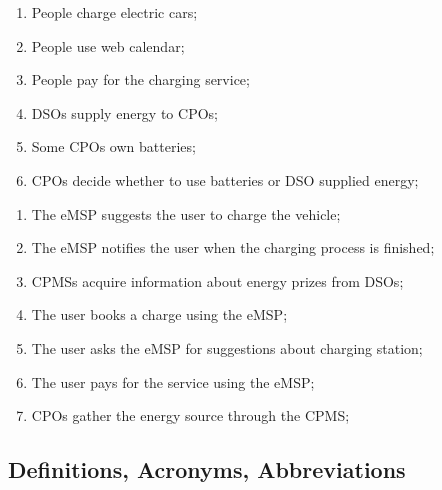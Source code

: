 \begin{enumerate}[label=W\arabic*]
    \item People charge electric cars; \label{world:people-charge-cars}
    \item People use web calendar; \label{world:people-use-calendars}
    \item People pay for the charging service; \label{world:people-pay-service}
    \item \acp{DSO} supply energy to \acp{CPO}; \label{world:DSO-supply-energy}
    \item Some \acp{CPO} own batteries; \label{world:CPO-own-batteries}
    \item \acp{CPO} decide whether to use batteries or \ac{DSO} supplied energy; \label{world:CPO-decide-energy}
\end{enumerate}
\begin{enumerate}[label=S\arabic*]
    \item The \ac{eMSP} suggests the user to charge the vehicle; \label{shared:eMSP-suggests-charge}
    \item The \ac{eMSP} notifies the user when the charging process is finished; \label{shared:eMSP-notifies-charging-finished}
    \item \acp{CPMS} acquire information about energy prizes from \acp{DSO}; \label{shared:CPMS-info-from-DSO}
    \item The user books a charge using the \ac{eMSP}; \label{shared:user-books-charge}
    \item The user asks the \ac{eMSP} for suggestions about charging station; \label{shared:user-asks-suggestions}
    \item The user pays for the service using the \ac{eMSP}; \label{shared:user-pays-service}
    \item \acp{CPO} gather the energy source through the \ac{CPMS}; \label{shared:CPO-energy-through-CPMS}
\end{enumerate}

\subsection{Definitions, Acronyms, Abbreviations}
\begin{multicols}{2}[]
    \begin{acronym}[RASD]
    \end{acronym}
\end{multicols}

